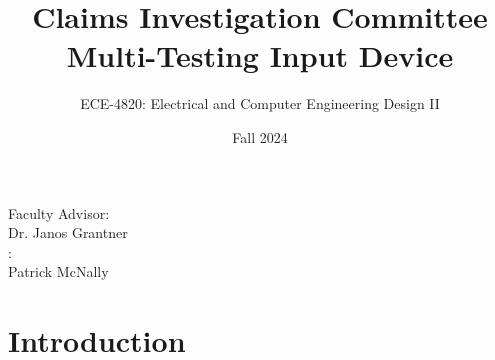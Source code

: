 \documentclass[8pt,compress]{beamer}
\title{Claims Investigation Committee Multi-Testing Input Device}
\subtitle{ECE-4820: Electrical and Computer Engineering Design II}
\author[Garza, Baker, Sah]{Dylan-Matthew Garza \and Daniel Baker \and Rohullah Sah \and}
\institute[VFU] %
{
      Department of Electrical and Computer Engineering\\
      Western Michigan University
      \and
      ZF Group\\
      Auburn Hills, MI
}
\date{Fall 2024}
\begin{document}
\begin{frame}[plain]
  \titlepage
  \small
  \begin{multicols}{2}
      Faculty Advisor:\\
      Dr. Janos Grantner\hfill\\
    \hfill{}:\\
    \hfill Patrick McNally
  \end{multicols}
\end{frame}

\section{Introduction}
\end{document}

